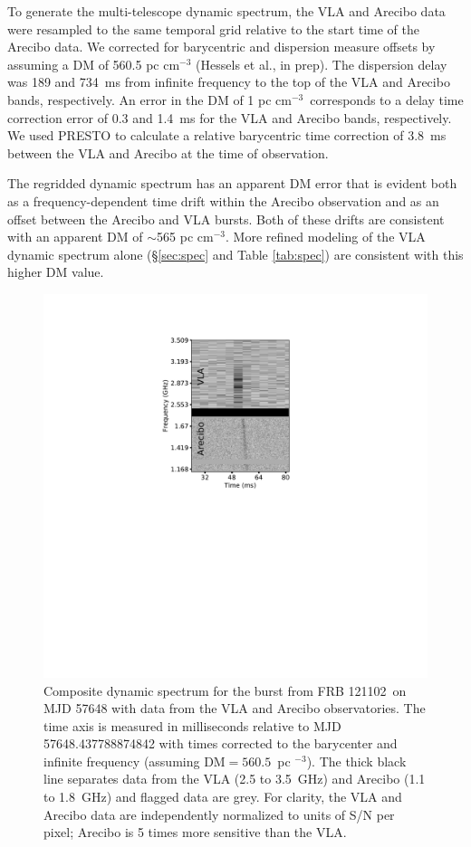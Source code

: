 \documentclass[twocolumn]{aastex61}
\newcommand{\frb}{FRB 121102}
\begin{document}
To generate the multi-telescope dynamic spectrum, the VLA and Arecibo data were resampled to the same temporal grid relative to the start time of the Arecibo data. We corrected for barycentric and dispersion measure offsets by assuming a DM of 560.5 pc cm$^{-3}$ (Hessels et al., in prep). The dispersion delay was 189 and 734~ms from infinite frequency to the top of the VLA and Arecibo bands, respectively. An error in the DM of 1 pc cm$^{-3}$\ corresponds to a delay time correction error of 0.3 and 1.4~ms for the VLA and Arecibo bands, respectively. We used PRESTO to calculate a relative barycentric time correction of 3.8~ms between the VLA and Arecibo at the time of observation.

The regridded dynamic spectrum has an apparent DM error that is evident both as a frequency-dependent time drift within the Arecibo observation and as an offset between the Arecibo and VLA bursts. Both of these drifts are consistent with an apparent DM of $\sim$565 pc cm$^{-3}$. More refined modeling of the VLA dynamic spectrum alone (\S \ref{sec:spec} and Table \ref{tab:spec}) are consistent with this higher DM value.

\begin{figure}[htb]
\begin{center}
 \includegraphics[trim=250 400 250 80, clip, width=\columnwidth]{aovla_spec.pdf}
 \caption{Composite dynamic spectrum for the burst from \frb\ on MJD 57648 with data from the VLA and Arecibo observatories. The time axis is measured in milliseconds relative to MJD 57648.437788874842 with times corrected to the barycenter and infinite frequency (assuming DM$=560.5$\ pc $^{-3}$). The thick black line separates data from the VLA (2.5 to 3.5~GHz) and Arecibo (1.1 to 1.8~GHz) and flagged data are grey. For clarity, the VLA and Arecibo data are independently normalized to units of S/N per pixel; Arecibo is 5 times more sensitive than the VLA.
 \label{fig:sgram}}
\end{center}
\end{figure}
\end{document}
